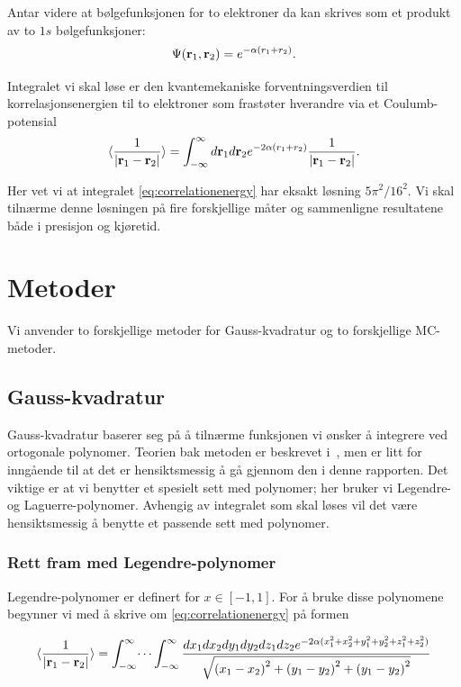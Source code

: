 \documentclass[11pt]{article}
\begin{document}
Antar videre at bølgefunksjonen for to elektroner da kan skrives som et produkt av
to $1s$ bølgefunksjoner:
\[
   \Psi({\bf r}_1,{\bf r}_2)  =   e^{-\alpha (r_1+r_2)}.
\]

Integralet vi skal løse er den kvantemekaniske forventningsverdien
til korrelasjonsenergien til to elektroner som frastøter hverandre via et Coulumb-potensial
\begin{equation}\label{eq:correlationenergy}
   \langle \frac{1}{|{\bf r}_1-{\bf r}_2|} \rangle =
   \int_{-\infty}^{\infty} d{\bf r}_1d{\bf r}_2  e^{-2\alpha (r_1+r_2)}\frac{1}{|{\bf r}_1-{\bf r}_2|}.
\end{equation}

Her vet vi at integralet \eqref{eq:correlationenergy} har eksakt løsning $5\pi^2/16^2$. Vi skal tilnærme denne 
løsningen på fire forskjellige måter og sammenligne resultatene både i presisjon og kjøretid.

\section{Metoder}
\label{sec:metoder}
Vi anvender to forskjellige metoder for Gauss-kvadratur og to forskjellige MC-metoder.
\subsection{Gauss-kvadratur}
\label{subsec:gauss-kvadratur}
Gauss-kvadratur baserer seg på å tilnærme funksjonen vi ønsker å
integrere ved ortogonale polynomer. Teorien bak metoden er beskrevet
i~\cite{Lecture-notes}, men er litt for inngående til at det er
hensiktsmessig å gå gjennom den i denne rapporten. Det viktige er at
vi benytter et spesielt sett med polynomer; her bruker vi Legendre- og
Laguerre-polynomer. Avhengig av integralet som skal løses vil det være
hensiktsmessig å benytte et passende sett med polynomer.

\subsubsection{Rett fram med Legendre-polynomer}
\label{subsubsec:gauss-legendre}
Legendre-polynomer er definert for $x\in[-1,1]$. For å bruke disse
polynomene begynner vi med å skrive om \eqref{eq:correlationenergy} på formen

\begin{align}\label{eq:xyzINT} 
  \langle \frac{1}{|{\bf r}_1-{\bf r}_2|} \rangle =
   \int_{-\infty}^{\infty} \dots \int_{-\infty}^{\infty}
   \frac{d{x}_1d{x}_2d{y}_1d{y}_2d{z}_1d{z}_2  
   e^{-2\alpha (x_1^2+x_2^2+y_1^2+y_2^2+z_1^2+z_2^2)}}{ \sqrt{{(x_1-x_2)}^2+{(y_1-y_2)}^2+{(y_1-y_2)}^2}}
\end{align}
\end{document}
